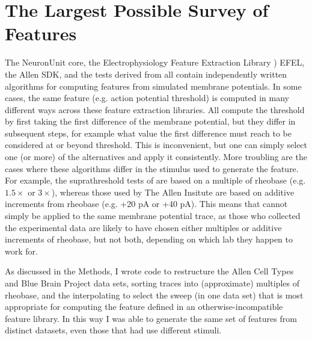\section{The Largest Possible Survey of Features}
The NeuronUnit core, the Electrophysiology Feature Extraction Library \citep{EFEL}) EFEL, the Allen SDK, and the tests derived from \citep{druckmann2008evaluating} all contain independently written algorithms for computing features from simulated membrane potentials.
In some cases, the same feature (e.g. action potential threshold) is computed in many different ways across these feature extraction libraries.
All compute the threshold by first taking the first difference of the membrane potential, but they differ in subsequent steps, for example what value the first difference must reach to be considered at or beyond threshold.
This is inconvenient, but one can simply select one (or more) of the alternatives and apply it consistently.
More troubling are the cases where these algorithms differ in the stimulus used to generate the feature.
For example, the suprathreshold tests of \citep{druckmann2008evaluating} are based on a multiple of rheobase (e.g. $1.5\times$ or $3\times$), whereas those used by The Allen Insitute are based on additive increments from rheobase (e.g. +20 pA or +40 pA).
This means that cannot simply be applied to the same membrane potential trace, as those who collected the experimental data are likely to have chosen either multiples or additive increments of rheobase, but not both, depending on which lab they happen to work for.

As discussed in the Methods, I wrote code to restructure the Allen Cell Types and Blue Brain Project data sets, sorting traces into (approximate) multiples of rheobase, and the interpolating to select the sweep (in one data set) that is most appropriate for computing the feature defined in an otherwise-incompatible feature library.
In this way I was able to generate the same set of features from distinct datasets, even those that had use different stimuli.

